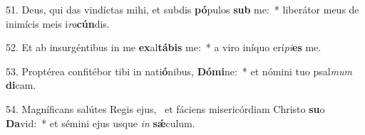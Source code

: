51. Deus, qui das vindíctas mihi, et subdis \textbf{pó}pulos \textbf{sub} me:~*  liberátor meus de inimícis meis i\textit{ra}\textbf{cún}dis.\

52. Et ab insurgéntibus in me \textbf{ex}al\textbf{tá}\textbf{bis} me:~*  a viro iníquo erí\textit{pi}\textbf{es} me.\

53. Proptérea confitébor tibi in nati\textbf{ó}nibus, \textbf{Dó}\textbf{mi}ne:~*  et nómini tuo psal\textit{mum} \textbf{di}cam.\

54. Magníficans salútes Regis ejus, \dag\  et fáciens misericórdiam Christo \textbf{su}o \textbf{Da}vid:~*  et sémini ejus usque \textit{in} \textbf{sǽ}culum.\

